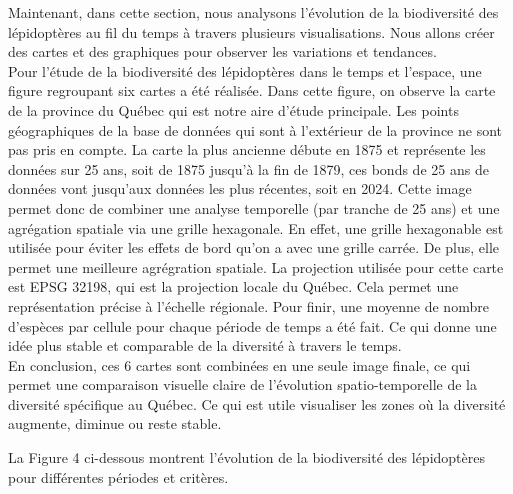 \documentclass[9pt,twocolumn,twoside,]{pnas-new}
\begin{document}
Maintenant, dans cette section, nous analysons l'évolution de la
biodiversité des lépidoptères au fil du temps à travers plusieurs
visualisations. Nous allons créer des cartes et des graphiques pour
observer les variations et tendances.\\
Pour l'étude de la biodiversité des lépidoptères dans le temps et
l'espace, une figure regroupant six cartes a été réalisée. Dans cette
figure, on observe la carte de la province du Québec qui est notre aire
d'étude principale. Les points géographiques de la base de données qui
sont à l'extérieur de la province ne sont pas pris en compte. La carte
la plus ancienne débute en 1875 et représente les données sur 25 ans,
soit de 1875 jusqu'à la fin de 1879, ces bonds de 25 ans de données vont
jusqu'aux données les plus récentes, soit en 2024. Cette image permet
donc de combiner une analyse temporelle (par tranche de 25 ans) et une
agrégation spatiale via une grille hexagonale. En effet, une grille
hexagonable est utilisée pour éviter les effets de bord qu'on a avec une
grille carrée. De plus, elle permet une meilleure agrégration spatiale.
La projection utilisée pour cette carte est EPSG 32198, qui est la
projection locale du Québec. Cela permet une représentation précise à
l'échelle régionale. Pour finir, une moyenne de nombre d'espèces par
cellule pour chaque période de temps a été fait. Ce qui donne une idée
plus stable et comparable de la diversité à travers le temps.\\
En conclusion, ces 6 cartes sont combinées en une seule image finale, ce
qui permet une comparaison visuelle claire de l'évolution
spatio-temporelle de la diversité spécifique au Québec. Ce qui est utile
visualiser les zones où la diversité augmente, diminue ou reste stable.

La Figure 4 ci-dessous montrent l'évolution de la biodiversité des
lépidoptères pour différentes périodes et critères.
\end{document}
